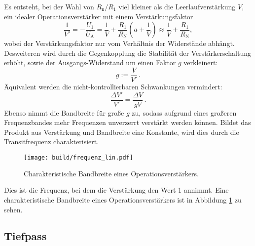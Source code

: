 Es entsteht, bei der Wahl von $R_\text{n}/ R_\text{1}$ viel kleiner als die
Leerlaufverstärkung $V$, ein idealer Operationsverstärker mit einem Verstärkungsfaktor
\begin{equation}
  \label{eq:v_strich}
		\frac{1}{V'}= - \frac{U_1}{U_\text{A}} = \frac{1}{V} +
		\frac{R_1}{R_\text{N}} \left( a + \frac{1}{V} \right) \approx
		\frac{1}{V} + \frac{R_1}{R_\text{N}},
\end{equation}
wobei der Verstärkungsfaktor nur vom Verhältnis der Widerstände abhängt.
Desweiteren wird durch die Gegenkopplung die Stabilität der
Verstärkerschaltung erhöht, sowie der Ausgangs-Widerstand um einen
Faktor $g$ verkleinert:
\begin{equation}
		g := \frac{V}{V'} \, .
\end{equation}
Äquivalent werden die nicht-kontrollierbaren Schwankungen vermindert:
\begin{equation}
		\frac{\Delta V'}{V'} = \frac{\Delta V}{g V} \, .
\end{equation}
Ebenso nimmt die Bandbreite für große $g$ zu, sodass aufgrund eines großeren
Frequenzbandes mehr Frequenzen unverzerrt verstärkt werden können.
Bildet das Produkt aus Verstärkung und Bandbreite eine Konstante,
wird dies durch die Transitfrequenz charakterisiert.
\begin{figure}[h]
		\centering
		\texttt{[image: build/frequenz\_lin.pdf]}
		\caption{Charakteristische Bandbreite eines Operationsverstärkers.\cite{anleitung}}
		\label{fig:freq}
\end{figure}
Dies ist die Frequenz, bei dem die Verstärkung den Wert 1 annimmt.
Eine charakteristische Bandbreite eines Operationsverstärkers ist in Abbildung
\ref{fig:freq} zu sehen.

\subsection{Tiefpass}%
\label{sub:tiefpass}

